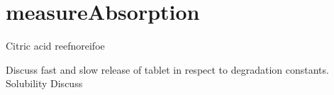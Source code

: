 \chapter{measureAbsorption}

Citric acid reefnoreifoe




Discuss fast and slow release of tablet in respect to degradation constants. Solubility
Discuss 